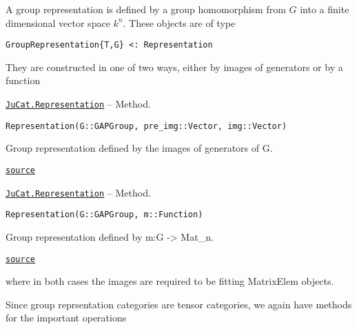 \documentclass{memoir}
\begin{document}
A group representation is defined by a group homomorphism from \(G\) into a finite dimensional vector space \(k^n\). These objects are of type




\begin{lstlisting}
GroupRepresentation{T,G} <: Representation
\end{lstlisting}



They are constructed in one of two ways, either by images of generators or by a function


\hypertarget{12571968626116161650}{} 
\hyperlink{12571968626116161650}{\texttt{JuCat.Representation}}  -- {Method.}

\begin{adjustwidth}{2em}{0pt}


\begin{verbatim}
Representation(G::GAPGroup, pre_img::Vector, img::Vector)
\end{verbatim}

Group representation defined by the images of generators of G.



\href{https://github.com/FabianMaeurer/JuCat.jl/blob/367390e2d003deec2ababa73caeab405e934bb35/src/structures/Representations/GroupRepresentations.jl#L35-L39}{\texttt{source}}


\end{adjustwidth}
\hypertarget{11844280100991716802}{} 
\hyperlink{11844280100991716802}{\texttt{JuCat.Representation}}  -- {Method.}

\begin{adjustwidth}{2em}{0pt}


\begin{verbatim}
Representation(G::GAPGroup, m::Function)
\end{verbatim}

Group representation defined by m:G -> Mat\_n.



\href{https://github.com/FabianMaeurer/JuCat.jl/blob/367390e2d003deec2ababa73caeab405e934bb35/src/structures/Representations/GroupRepresentations.jl#L49-L53}{\texttt{source}}


\end{adjustwidth}

where in both cases the images are required to be fitting MatrixElem objects.



Since group reprsentation categories are tensor categories, we again have methods for the important operations
\end{document}
